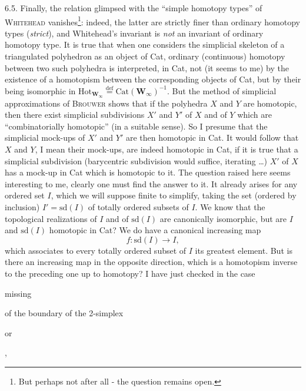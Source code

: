 \documentclass[11pt]{article}
\newcommand{\msp}[1]{\marginpar{\footnotesize [#1]}}
\begin{document}
\msp{page 92}
6.5. Finally, the relation glimpsed with the ``simple homotopy types'' of \textsc{Whitehead} vanishes\footnote[44]{But perhaps not after all - the question remains open.}: indeed, the latter are strictly finer than ordinary homotopy types (\textit{strict}), and Whitehead's invariant is \textit{not} an invariant of ordinary homotopy type. It is true that when one considers the simplicial skeleton of a triangulated polyhedron as an object of Cat, ordinary (continuous) homotopy between two such polyhedra is interpreted, in Cat, not (it seems to me) by the existence of a homotopism between the corresponding objects of Cat, but by their being isomorphic in $\mathrm{Hot}_{\mathbf{W}_\infty} \overset{\text{def}}{=} \mathrm{Cat}(\mathbf{W}_\infty)^{-1}$. But the method of simplicial approximations of \textsc{Brouwer} shows that if the polyhedra $X$ and $Y$ are homotopic, then there exist simplicial subdivisions $X'$ and $Y'$ of $X$ and of $Y$ which are ``combinatorially homotopic'' (in a suitable sense). So I presume that the simplicial mock-ups of $X'$ and $Y'$ are then homotopic in Cat. It would follow that %
\msp{page 93}
$X$ and $Y$, I mean their mock-ups, are indeed homotopic in Cat, if it is true that a simplicial subdivision (barycentric subdivision would suffice, iterating \ldots) $X'$ of $X$ has a mock-up in Cat which is homotopic to it. The question raised here seems interesting to me, clearly one must find the answer to it. It already arises for any ordered set $I$, which we will suppose finite to simplify, taking the set (ordered by inclusion) $I' = \mathrm{sd}(I)$ of totally ordered subsets of $I$. We know that the topological realizations of $I$ and of $\mathrm{sd}(I)$ are canonically isomorphic, but are $I$ and $\mathrm{sd}(I)$ homotopic in Cat? We do have a canonical increasing map %
\[ f : \mathrm{sd}(I) \longrightarrow I, \]
which associates to every totally ordered subset of $I$ its greatest element. But is there an increasing map in the opposite direction, which is a homotopism inverse to the preceding one up to homotopy? I have just checked in the case

\msp{page 94} missing

\msp{page 95}
of the boundary of the 2-simplex

\begin{center}
\qquad\qquad\qquad or \qquad\qquad\qquad
{}
\qquad\quad ,
\end{center}
\end{document}
